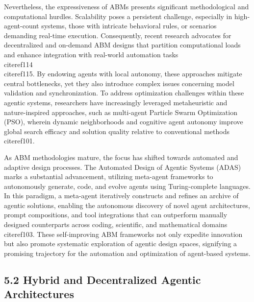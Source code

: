 \documentclass[11pt]{article}
\begin{document}
Nevertheless, the expressiveness of ABMs presents significant methodological and computational hurdles. Scalability poses a persistent challenge, especially in high-agent-count systems, those with intricate behavioral rules, or scenarios demanding real-time execution. Consequently, recent research advocates for decentralized and on-demand ABM designs that partition computational loads and enhance integration with real-world automation tasks~\\cite{ref114}\\cite{ref115}. By endowing agents with local autonomy, these approaches mitigate central bottlenecks, yet they also introduce complex issues concerning model validation and synchronization. To address optimization challenges within these agentic systems, researchers have increasingly leveraged metaheuristic and nature-inspired approaches, such as multi-agent Particle Swarm Optimization (PSO), wherein dynamic neighborhoods and cognitive agent autonomy improve global search efficacy and solution quality relative to conventional methods~\\cite{ref101}.

As ABM methodologies mature, the focus has shifted towards automated and adaptive design processes. The Automated Design of Agentic Systems (ADAS) marks a substantial advancement, utilizing meta-agent frameworks to autonomously generate, code, and evolve agents using Turing-complete languages. In this paradigm, a meta-agent iteratively constructs and refines an archive of agentic solutions, enabling the autonomous discovery of novel agent architectures, prompt compositions, and tool integrations that can outperform manually designed counterparts across coding, scientific, and mathematical domains~\\cite{ref103}. These self-improving ABM frameworks not only expedite innovation but also promote systematic exploration of agentic design spaces, signifying a promising trajectory for the automation and optimization of agent-based systems.

\subsection{5.2 Hybrid and Decentralized Agentic Architectures}
\end{document}
